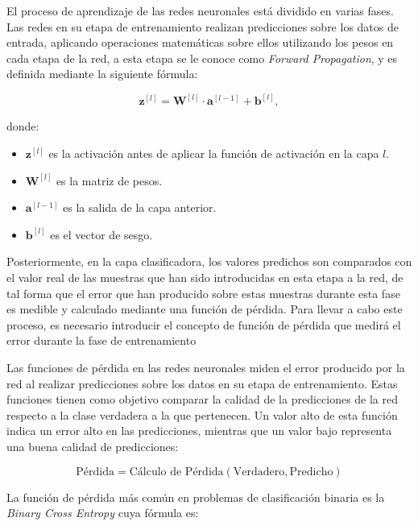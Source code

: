 
El proceso de aprendizaje de las redes neuronales está dividido en varias fases. Las redes en su etapa de entrenamiento realizan predicciones sobre los datos de entrada, aplicando operaciones matemáticas sobre ellos utilizando los pesos en cada etapa de la red, a esta etapa se le conoce como \textit{Forward Propagation}, y es definida mediante la siguiente fórmula:


\[
\mathbf{z}^{[l]} = \mathbf{W}^{[l]} \cdot \mathbf{a}^{[l-1]} + \mathbf{b}^{[l]},
\]

donde:
\begin{itemize}
	\item \(\mathbf{z}^{[l]}\) es la activación antes de aplicar la función de activación en la capa \(l\).
	\item \(\mathbf{W}^{[l]}\) es la matriz de pesos.
	\item \(\mathbf{a}^{[l-1]}\) es la salida de la capa anterior.
	\item \(\mathbf{b}^{[l]}\) es el vector de sesgo.
\end{itemize}

Posteriormente, en la capa clasificadora, los valores predichos son comparados con el valor real de las muestras que han sido introducidas en esta etapa a la red, de tal forma que el error que han producido sobre estas muestras durante esta fase es medible y calculado mediante una función de pérdida. Para llevar a cabo este proceso, es necesario introducir el concepto de función de pérdida que medirá el error durante la fase de entrenamiento



Las funciones de pérdida en las redes neuronales miden el error producido por la red al realizar predicciones sobre los datos en su etapa de entrenamiento. Estas funciones tienen como objetivo comparar la calidad de la predicciones de la red respecto a la clase verdadera a la que pertenecen. Un valor alto de esta función indica un error alto en las predicciones, mientras que un valor bajo representa una buena calidad de predicciones:

\[
\text{Pérdida} = \text{Cálculo de Pérdida} (\text{Verdadero}, \text{Predicho})
\]

La función de pérdida más común en problemas de clasificación binaria es la \textit{Binary Cross Entropy} cuya fórmula es:

